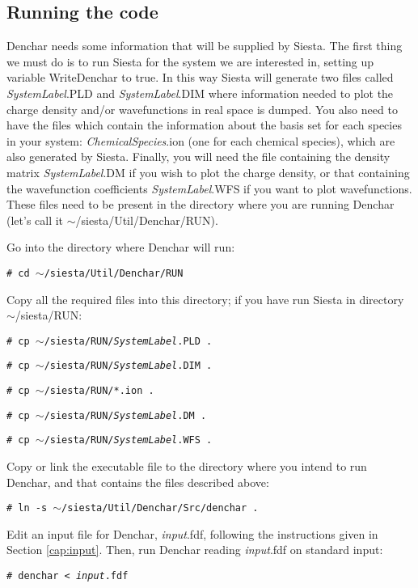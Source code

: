 \subsection{Running the code}

 {\sc Denchar} needs some information that will be supplied by {\sc Siesta}. 
 The first thing we must do is to run {\sc Siesta} for 
 the system we are interested in,
 setting up variable WriteDenchar to true. 
 In this way {\sc Siesta} will generate
 two files called {\it SystemLabel}.PLD and {\it SystemLabel}.DIM
 where information 
 needed to plot the charge density and/or wavefunctions 
 in real space is dumped. You also need to have the files which
 contain the information about the basis set for each species
 in your system: {\it ChemicalSpecies}.ion (one for each
 chemical species), which
 are also generated by  {\sc Siesta}.
 Finally, you will need the file containing the
 density matrix {\it SystemLabel}.DM if you wish to plot
 the charge density, or that containing the wavefunction
 coefficients {\it SystemLabel}.WFS if you want to plot
 wavefunctions. These files need to be present in the
 directory where you are running {\sc Denchar} (let's call it
 $\sim$/siesta/Util/Denchar/RUN).

 Go into the directory where {\sc Denchar} will run:

 {\tt \# cd $\sim$/siesta/Util/Denchar/RUN}

 Copy all the required files into this directory; if you
 have run {\sc Siesta} in directory $\sim$/siesta/RUN:

 {\tt \# cp $\sim$/siesta/RUN/{\it SystemLabel}.PLD .}

 {\tt \# cp $\sim$/siesta/RUN/{\it SystemLabel}.DIM .}

 {\tt \# cp $\sim$/siesta/RUN/*.ion .}

 {\tt \# cp $\sim$/siesta/RUN/{\it SystemLabel}.DM .}

 {\tt \# cp $\sim$/siesta/RUN/{\it SystemLabel}.WFS .}

 Copy or link the executable file to the directory
 where you intend to run  {\sc Denchar}, and that
 contains the files described above:

 {\tt \# ln -s $\sim$/siesta/Util/Denchar/Src/denchar . }

 Edit an input file for {\sc Denchar}, {\it input}.fdf, following the 
 instructions given in Section \ref{cap:input}. Then,
 run  {\sc Denchar} reading {\it input}.fdf on
 standard input:


 {\tt \# denchar < {\it input}.fdf } 


